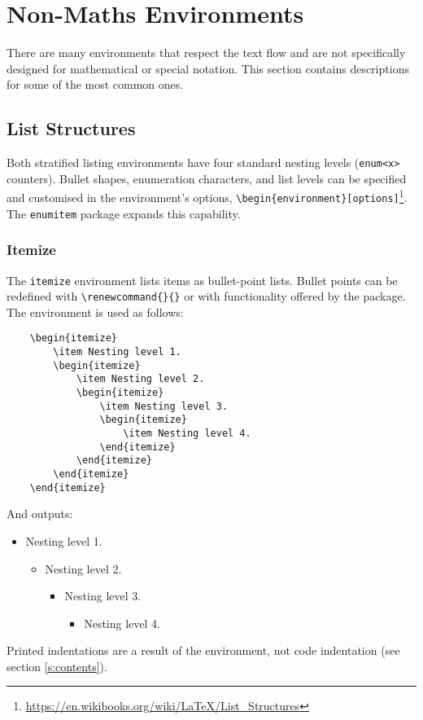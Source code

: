 \chapter{Non-Maths Environments}
%
There are many environments that respect the text flow and are not
specifically designed for mathematical or special notation.  This
section contains descriptions for some of the most common ones.
%
\section{List Structures}
%
Both stratified listing environments have four standard nesting levels
(\verb|enum<x>| counters).  Bullet shapes, enumeration characters, and
list levels can be specified and customised in the environment's
options,
\verb|\begin{environment}[options]|\footnote{\url{https://en.wikibooks.org/wiki/LaTeX/List_Structures}}.
  The \verb|enumitem| package expands this capability.
%
\subsection{Itemize}
%
The \verb|itemize| environment lists items as bullet-point lists.
Bullet points can be redefined with \verb|\renewcommand{}{}| or with
functionality offered by the  package.  The environment
is used as follows:
\begin{verbatim}
	\begin{itemize}
    	\item Nesting level 1.
	    \begin{itemize}
    	    \item Nesting level 2.
        	\begin{itemize}
            	\item Nesting level 3.
	            \begin{itemize}
    	            \item Nesting level 4.
        	    \end{itemize}
	        \end{itemize}
	    \end{itemize}
	\end{itemize}
\end{verbatim}
And outputs:
\begin{itemize}
\item Nesting level 1.
  \begin{itemize}
  \item Nesting level 2.
    \begin{itemize}
    \item Nesting level 3.
      \begin{itemize}
      \item Nesting level 4.
      \end{itemize}
    \end{itemize}
  \end{itemize}
\end{itemize}
Printed indentations are a result of the environment, not code
indentation (see section \ref{s:contents}).
%
